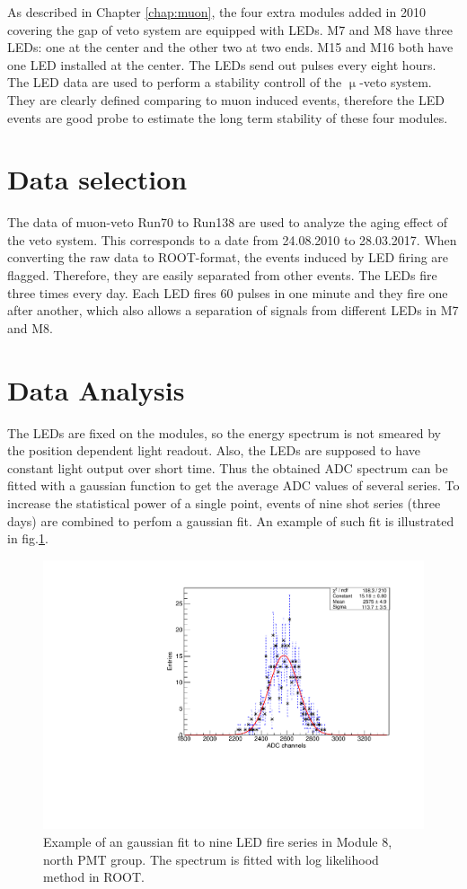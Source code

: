 As described in Chapter \ref{chap:muon}, the four extra modules added in 2010 covering the gap of veto system are equipped with LEDs. M7 and M8 have three LEDs: one at the center and the other two at two ends. M15 and M16 both have one LED installed at the center. The LEDs send out pulses every eight hours. The LED data are used to perform a stability controll of the $\upmu$-veto system. They are clearly defined comparing to muon induced events, therefore the LED events are good probe to estimate the long term stability of these four modules.
\section{Data selection}
The data of muon-veto Run70 to Run138 are used to analyze the aging effect of the veto system. This corresponds to a date from 24.08.2010 to 28.03.2017. When converting the raw data to ROOT-format, the events induced by LED firing are flagged. Therefore, they are easily separated from other events.
The LEDs fire three times every day. Each LED fires 60 pulses in one minute and they fire one after another, which also allows a separation of signals from different LEDs in M7 and M8.



\section{Data Analysis}
The LEDs are fixed on the modules, so the energy spectrum is not smeared by the position dependent light readout. Also, the LEDs are supposed to have constant light output over short time. Thus the obtained ADC spectrum can be fitted with a gaussian function to get the average ADC values of several series.
To increase the statistical power of a single point, events of nine shot series (three days) are combined to perfom a gaussian fit. An example of such fit is illustrated in fig.\ref{fig:gaussian-fit}.

\begin{figure}[htb!]
  \centering
  \includegraphics[width=0.5\textwidth{}]{./fig/gaussianM8.pdf}
  \caption{Example of an gaussian fit to nine LED fire series in Module 8, north PMT group. The spectrum is fitted with log likelihood method in ROOT.}
  \label{fig:gaussian-fit}
\end{figure}

